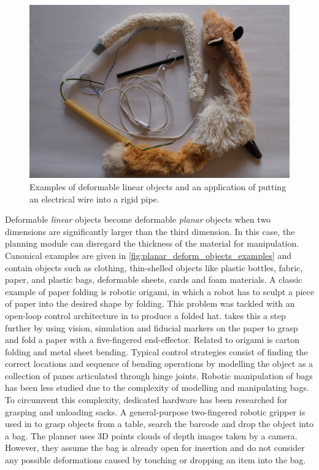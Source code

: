 \begin{figure}[htbp!]
    \centering
    \includegraphics[keepaspectratio,width=\textwidth]{figures/fig_dlos.JPG}
    \caption[Real-life examples of deformable linear objects.]{Examples of deformable linear objects and an application of putting an electrical wire into a rigid pipe.}
    \label{fig:dlo_examples}
\end{figure}

Deformable \textit{linear} objects become deformable \textit{planar} objects when two dimensions are significantly larger than the third dimension. 
In this case, the planning module can disregard the thickness of the material for manipulation. Canonical examples are given in \cref{fig:planar_deform_objects_examples} and contain objects such as clothing, thin-shelled objects like plastic bottles, fabric, paper, and plastic bags, deformable sheets, cards and foam materials. A classic example of paper folding is robotic origami, in which a robot has to sculpt a piece of paper into the desired shape by folding. This problem was tackled with an open-loop control architecture in \autocite{Balkcom2008} to produce a folded hat. \Textcite{Elbrechter2012} takes this a step further by using vision, simulation and fiducial markers on the paper to grasp and fold a paper with a five-fingered end-effector. Related to origami is carton folding and metal sheet bending. Typical control strategies \autocite{Liang1999,Liu2003,Aomura2002} consist of finding the correct locations and sequence of bending operations by modelling the object as a collection of panes articulated through hinge joints. Robotic manipulation of bags has been less studied due to the complexity of modelling and manipulating bags. To circumvent this complexity, dedicated hardware has been researched for grasping \autocite{Kazerooni2005} and unloading \autocite{Kirchheim2008} sacks. A general-purpose two-fingered robotic gripper is used in \autocite{Klingbeil2011} to grasp objects from a table, search the barcode and drop the object into a bag. The planner uses 3D points clouds of depth images taken by a camera. However, they assume the bag is already open for insertion and do not consider any possible deformations caused by touching or dropping an item into the bag.

